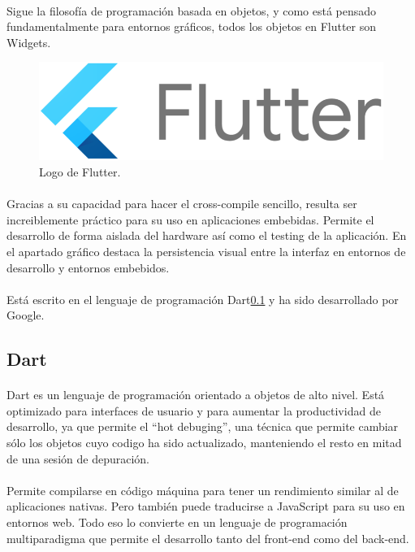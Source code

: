 \paragraph{} Sigue la filosofía de programación basada en objetos, y como está pensado
fundamentalmente para entornos gráficos, todos los objetos en Flutter son \gls{Widgets}.

\begin{figure}[h]
	\centering
	\includegraphics[width=0.50\linewidth]{imgs/flutter-logo}
	\caption[Flutter Logo]{Logo de Flutter.}
	\label{fig:flutter}
\end{figure}

\paragraph{} Gracias a su capacidad para hacer el \gls{cross-compile} sencillo, resulta
ser increiblemente práctico para su uso en aplicaciones embebidas. Permite el desarrollo
de forma aislada del hardware así como el testing de la aplicación. En el apartado
gráfico destaca la persistencia visual entre la interfaz en entornos de desarrollo y
entornos embebidos.

\paragraph{} Está escrito en el lenguaje de programación Dart\ref{sec:dart} y ha sido
desarrollado por Google.

\subsection{Dart}\label{sec:dart}

\paragraph{}Dart es un lenguaje de programación orientado a objetos de alto nivel.
Está optimizado para interfaces de usuario y para aumentar la productividad de desarrollo,
ya que permite el ``hot debuging'', una técnica que permite cambiar sólo los objetos cuyo
codigo ha sido actualizado, manteniendo el resto en mitad de una sesión de depuración.
\cite{dart}

\paragraph{}Permite compilarse en código máquina para tener un rendimiento similar al
de aplicaciones nativas. Pero también puede traducirse a JavaScript para su uso en
entornos web. Todo eso lo convierte en un lenguaje de programación multiparadigma que
permite el desarrollo tanto del \gls{front-end} como del \gls{back-end}.

